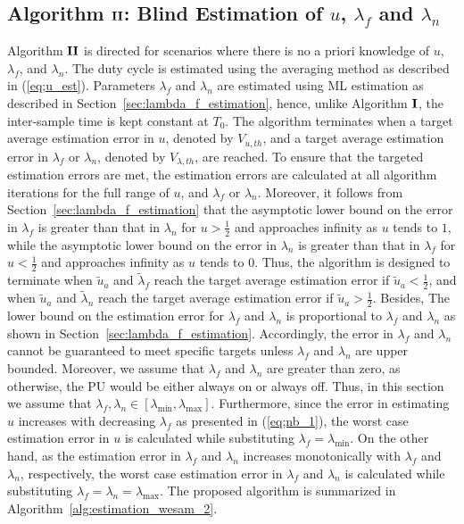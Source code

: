 \documentclass[11pt,draftclsnofoot,journal,onecolumn]{IEEEtran}
\begin{document}
\subsection{Algorithm $\bf{II}$: Blind Estimation of $u$, $\lambda_f$ and $\lambda_n$}
\label{sec:algorithm_II}

Algorithm $\bf{II}$ is directed for scenarios where there is no a priori knowledge of $u$, $\lambda_f$, and $\lambda_n$. The duty cycle is estimated using the averaging method as described in (\ref{eq;u_est}). Parameters $\lambda_f$ and $\lambda_n$ are estimated using ML estimation as described in Section~\ref{sec:lambda_f_estimation}, hence, unlike Algorithm $\bf{I}$, the inter-sample time is kept constant at $T_0$. The algorithm terminates when a target average estimation error in $u$, denoted by $V_{u,th}$, and a target average estimation error in $\lambda_f$ or $\lambda_n$, denoted by $V_{\lambda,th}$, are reached. To ensure that the targeted estimation errors are met, the estimation errors are calculated at all algorithm iterations for the full range of $u$, and $\lambda_f$ or $\lambda_n$. Moreover, it follows from Section~\ref{sec:lambda_f_estimation} that the asymptotic lower bound on the error in $\lambda_f$ is greater than that in $\lambda_n$ for $u>\frac{1}{2}$ and approaches infinity as $u$ tends to $1$, while the asymptotic lower bound on the error in $\lambda_n$ is greater than that in $\lambda_f$ for $u<\frac{1}{2}$ and approaches infinity as $u$ tends to $0$. Thus, the algorithm is designed to terminate when $\tilde{u}_a$ and $\tilde{\lambda}_f$ reach the target average estimation error if $\tilde{u}_a<\frac{1}{2}$, and when $\tilde{u}_a$ and $\tilde{\lambda}_n$ reach the target average estimation error if $\tilde{u}_a>\frac{1}{2}$. Besides, The lower bound on the estimation error for $\lambda_f$ and $\lambda_n$ is proportional to $\lambda_f$ and $\lambda_n$ as shown in Section~\ref{sec:lambda_f_estimation}. Accordingly, the error in $\lambda_f$ and $\lambda_n$ cannot be guaranteed to meet specific targets unless $\lambda_f$ and $\lambda_n$ are upper bounded. Moreover, we assume that $\lambda_f$ and $\lambda_n$ are greater than zero, as otherwise, the PU would be either always on or always off. Thus, in this section we assume that $\lambda_f, \lambda_n \in [\lambda_{\min}, \lambda_{\max}]$. Furthermore, since the error in estimating $u$ increases with decreasing $\lambda_f$ as presented in (\ref{eq;nb_1}), the worst case estimation error in $u$ is calculated while substituting $\lambda_f=\lambda_{\min}$. On the other hand, as the estimation error in $\lambda_f$ and $\lambda_n$ increases monotonically with $\lambda_f$ and $\lambda_n$, respectively, the worst case estimation error in $\lambda_f$ and $\lambda_n$ is calculated while substituting $\lambda_f=\lambda_n=\lambda_{\max}$. The proposed algorithm is summarized in Algorithm~\ref{alg:estimation_wesam_2}.
\end{document}
